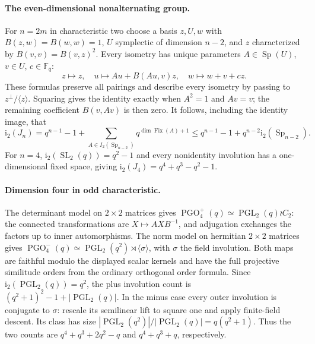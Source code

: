 \documentclass[10pt]{article}
\newcommand{\ii}{\mathrm i_2}\newcommand{\F}{\mathbb F}\newcommand{\GL}{\operatorname{GL}}\newcommand{\GU}{\operatorname{GU}}\newcommand{\Sp}{\operatorname{Sp}}\newcommand{\PGO}{\operatorname{PGO}}
\newcommand{\PGL}{\operatorname{PGL}}\newcommand{\PGU}{\operatorname{PGU}}\newcommand{\PSL}{\operatorname{PSL}}\newcommand{\PSU}{\operatorname{PSU}}
\begin{document}
\paragraph{The even-dimensional nonalternating group.}
For $n=2m$ in characteristic two choose a basis $z,U,w$ with
$B(z,w)=B(w,w)=1$, $U$ symplectic of dimension $n-2$, and $z$ characterized
by $B(v,v)=B(v,z)^2$. Every isometry has unique parameters
$A\in\Sp(U)$, $v\in U$, $c\in\F_q$:
\[
 z\mapsto z,\quad u\mapsto Au+B(Au,v)z,\quad w\mapsto w+v+cz.
\]
These formulas preserve all pairings and describe every isometry by passing
to $z^\perp/\langle z\rangle$. Squaring gives the identity exactly when
$A^2=1$ and $Av=v$; the remaining coefficient $B(v,Av)$ is then zero.
It follows, including the identity image, that
\begin{equation}\label{Jcount}
 \ii(J_n)=q^{n-1}-1+\sum_{A\in I_2(\Sp_{n-2})}q^{\dim\operatorname{Fix}(A)+1}
 \le q^{n-1}-1+q^{n-2}\ii(\Sp_{n-2}).
\end{equation}
For $n=4$, $\ii(\operatorname{SL}_2(q))=q^2-1$ and every nonidentity
involution has a one-dimensional fixed space, giving
$\ii(J_4)=q^4+q^3-q^2-1$.

\paragraph{Dimension four in odd characteristic.}
The determinant model on $2\times2$ matrices gives
$\PGO_4^+(q)\simeq\PGL_2(q)\wr C_2$: the connected transformations
are $X\mapsto AXB^{-1}$, and adjugation exchanges the factors up to inner
automorphisms. The norm model on hermitian $2\times2$ matrices gives
$\PGO_4^-(q)\simeq\PGL_2(q^2)\rtimes\langle\sigma\rangle$, with
$\sigma$ the field involution. Both maps are faithful modulo the displayed
scalar kernels and have the full projective similitude orders from the
ordinary orthogonal order formula. Since $\ii(\PGL_2(q))=q^2$, the plus
involution count is $(q^2+1)^2-1+|\PGL_2(q)|$. In the minus case every
outer involution is conjugate to $\sigma$: rescale its semilinear lift to
square one and apply finite-field descent. Its class has size
$|\PGL_2(q^2)|/|\PGL_2(q)|=q(q^2+1)$. Thus the two counts are
$q^4+q^3+2q^2-q$ and $q^4+q^3+q$, respectively.
\end{document}
